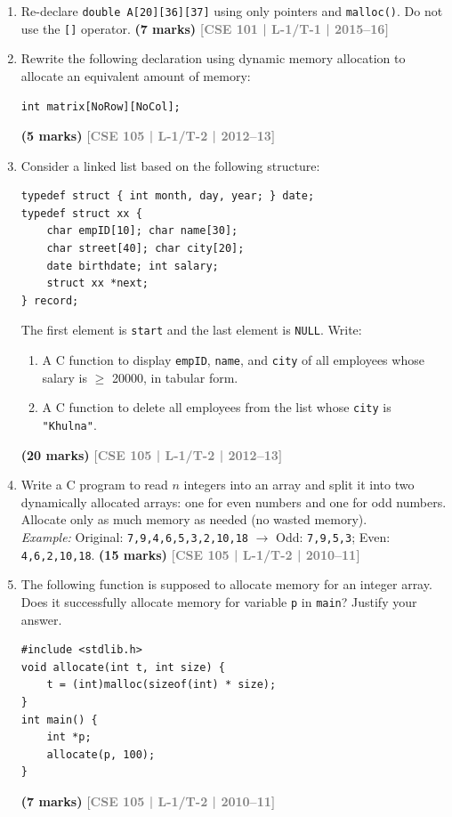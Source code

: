 \documentclass[12pt,a3paper]{article}
\newcommand{\yr}[1]{\hfill\textcolor{gray}{\small\textbf{[#1]}}}
\newcommand{\mk}[1]{\textcolor{orange!70!black}{\small\textbf{(#1 marks)}}}
\begin{document}
\begin{enumerate}
\item Re-declare \texttt{double A[20][36][37]} using only pointers and \texttt{malloc()}. Do not use the \texttt{[]} operator.
\mk{7} \yr{CSE 101 | L-1/T-1 | 2015--16}

\item Rewrite the following declaration using dynamic memory allocation to allocate an equivalent amount of memory:
 
\begin{lstlisting}
int matrix[NoRow][NoCol];
\end{lstlisting}
\mk{5} \yr{CSE 105 | L-1/T-2 | 2012--13}

\item Consider a linked list based on the following structure:
\begin{lstlisting}
typedef struct { int month, day, year; } date;
typedef struct xx {
    char empID[10]; char name[30];
    char street[40]; char city[20];
    date birthdate; int salary;
    struct xx *next;
} record;
\end{lstlisting}
The first element is \texttt{start} and the last element is \texttt{NULL}. Write:
\begin{enumerate}
  \item A C function to display \texttt{empID}, \texttt{name}, and \texttt{city} of all employees whose salary is $\ge$ 20000, in tabular form.
  \item A C function to delete all employees from the list whose \texttt{city} is \texttt{"Khulna"}.
\end{enumerate}
\mk{20} \yr{CSE 105 | L-1/T-2 | 2012--13}

\item Write a C program to read $n$ integers into an array and split it into two dynamically allocated arrays: one for even numbers and one for odd numbers. Allocate only as much memory as needed (no wasted memory).\\
\textit{Example:} Original: \texttt{7,9,4,6,5,3,2,10,18} $\to$ Odd: \texttt{7,9,5,3}; Even: \texttt{4,6,2,10,18}.
\mk{15} \yr{CSE 105 | L-1/T-2 | 2010--11}

\item The following function is supposed to allocate memory for an integer array. Does it successfully allocate memory for variable \texttt{p} in \texttt{main}? Justify your answer.
 
\begin{lstlisting}
#include <stdlib.h>
void allocate(int t, int size) {
    t = (int)malloc(sizeof(int) * size);
}
int main() {
    int *p;
    allocate(p, 100);
}
\end{lstlisting}
\mk{7} \yr{CSE 105 | L-1/T-2 | 2010--11}


\end{enumerate}
\end{document}
